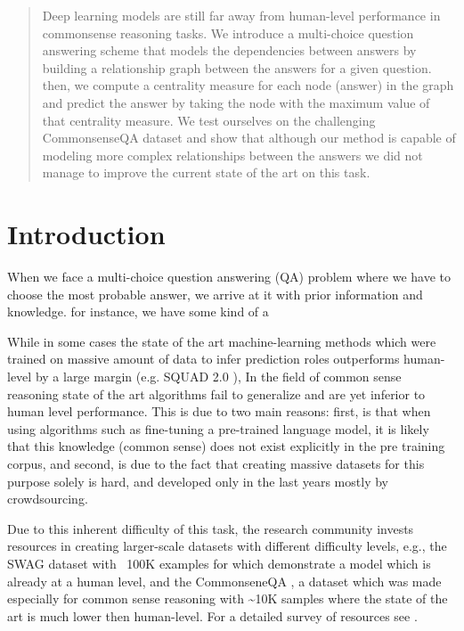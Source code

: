 \documentclass{article}
\begin{document}
\begin{abstract}
Deep learning models are still far away from human-level performance in commonsense reasoning tasks.
We introduce a multi-choice question answering scheme that models the dependencies between answers by
building a relationship graph between the answers for a given question. 
then, we compute a centrality measure for each node (answer) in the graph and predict the answer by taking the node with the maximum value of that centrality measure.
We test ourselves on the challenging CommonsenseQA dataset and show that although our method is capable of modeling more complex relationships between the answers we did not manage to improve the current state of the art on this task.
\end{abstract}

\section{Introduction}
When we face a multi-choice question answering (QA) problem where we have to choose the most probable answer, we arrive at it with prior information and knowledge. for instance, we have some kind of a


While in some cases the state of the art machine-learning methods which were trained on massive amount of data to infer prediction roles
outperforms human-level by a large margin (e.g. SQUAD 2.0 \cite{rajpurkar2018know}),
In the field of common sense reasoning  \cite{talmor2018commonsenseqa} state of the art algorithms fail to generalize and are yet inferior to human level performance.
This is due to two main reasons: first, is that when using algorithms such as fine-tuning a pre-trained language model, it is likely that this knowledge (common sense) does not exist explicitly in the pre training corpus, and second, is due to the fact that creating massive datasets for this purpose solely is hard, and developed only in the last years mostly by crowdsourcing.

Due to this inherent difficulty of this task, the research community invests resources in creating larger-scale datasets with different difficulty levels, e.g., the SWAG \cite{zellers2018swag} dataset with ~100K examples for which \cite{devlin2018bert} demonstrate a model which is already at a human level, and the CommonseneQA \cite{talmor2018commonsenseqa}, a dataset which was made especially for common sense reasoning with \~{}10K samples where the state of the art is much lower then human-level. For a detailed survey of resources see \cite{storks2019commonsense}. 
\end{document}

